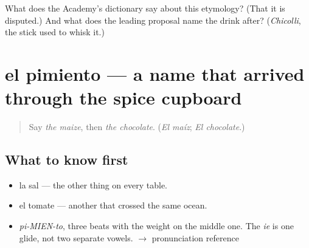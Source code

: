 \begin{tcolorbox}[breakable,colback=teal!4,colframe=teal!35!black,title={Before you move on}]
What does the Academy's dictionary say about this etymology? (That it is disputed.) And what does the leading proposal name the drink after? (\emph{Chicolli}, the stick used to whisk it.)
\end{tcolorbox}
\section[el pimiento]{el pimiento — a name that arrived through the spice cupboard}

\label{lesson:ES-C376-pimiento}



\begin{quote}
Say \emph{the maize}, then \emph{the chocolate}. (\emph{El maíz}; \emph{El chocolate}.)
\end{quote}

\subsection*{What to know first}
\begin{itemize}
\raggedright
  \item la sal — the other thing on every table.
  \item el tomate — another that crossed the same ocean.
\end{itemize}

\begin{sounds}
\begin{itemize}
\raggedright
  \item \emph{pi-MIEN-to}, three beats with the weight on the middle one. The \emph{ie} is one glide, not two separate vowels. $\to$ pronunciation reference
\end{itemize}
\end{sounds}

